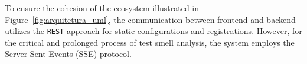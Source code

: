 \documentclass[sigconf]{acmart}
\begin{document}


To ensure the cohesion of the ecosystem illustrated in Figure~\ref{fig:arquitetura_uml}, the communication between frontend and backend utilizes the \texttt{REST} approach for static configurations and registrations. However, for the critical and prolonged process of test smell analysis, the system employs the Server-Sent Events (SSE) protocol. 

\end{document}
